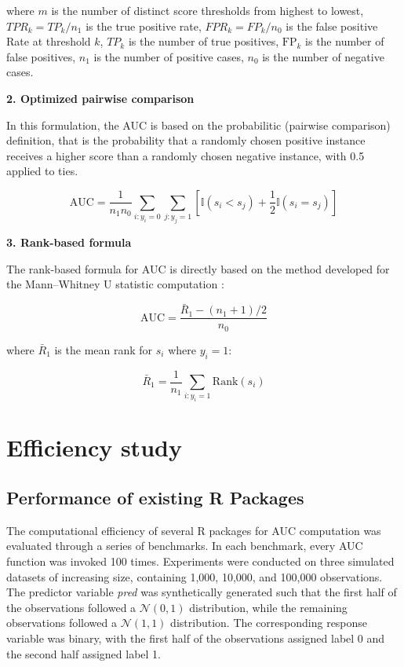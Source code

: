 where \(m\) is the number of distinct score thresholds from highest to
lowest, \(TPR_k=TP_k/n_1\) is the true positive rate, \(FPR_k=FP_k/n_0\) is
the false positive Rate at threshold \(k\), \(TP_k\) is the number of true
positives, \(\text{FP}_k\) is the number of false positives, \(n_1\) is the
number of positive cases, \(n_0\) is the number of negative cases.

\textbf{2. Optimized pairwise comparison}

In this formulation, the AUC is based on the probabilitic (pairwise
comparison) definition, that is the probability that a randomly chosen
positive instance receives a higher score than a randomly chosen
negative instance, with 0.5 applied to ties.

\[\text{AUC} = \frac{1}{n_1 n_0}\sum_{i:y_i=0}\sum_{j:y_j=1}\left[\mathbb{I}(s_i<s_j)+\frac{1}{2}\mathbb{I}(s_i=s_j)\right]\]

\textbf{3. Rank-based formula}

The rank-based formula for AUC is directly based on the method developed
for the Mann--Whitney U statistic computation \citep[see][]{Sheskin_2020}:

\[\text{AUC} = \frac{\bar{R}_{1}-{(n_1+1)}/2}{n_0}\]

where \(\bar{R}_{1}\) is the mean rank for \(s_i\) where \(y_i=1\):

\[\bar{R}_{1} = \frac{1}{n_1}\sum_{i:y_i=1}\text{Rank}(s_i)\]

\section{Efficiency study}\label{efficiency-study}

\subsection{Performance of existing R Packages}\label{performance-of-existing-r-packages}

The computational efficiency of several R packages for AUC computation
was evaluated through a series of benchmarks. In each benchmark, every
AUC function was invoked 100 times. Experiments were conducted on three
simulated datasets of increasing size, containing 1,000, 10,000, and
100,000 observations. The predictor variable \emph{pred} was synthetically
generated such that the first half of the observations followed a
\(\mathcal{N}(0,1)\) distribution, while the remaining observations
followed a \(\mathcal{N}(1,1)\) distribution. The corresponding response
variable was binary, with the first half of the observations assigned
label 0 and the second half assigned label 1.

